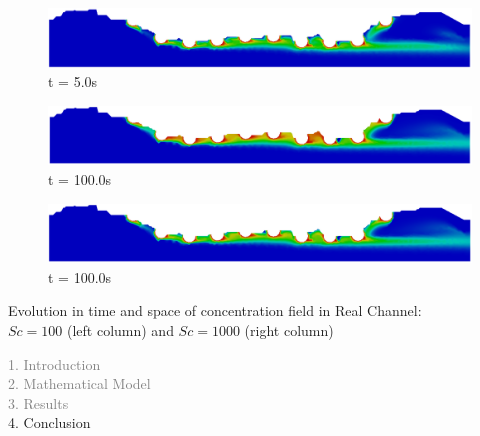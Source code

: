 \begin{frame}
\begin{figure}
     \begin{minipage}{.50\linewidth}
     \medskip
      \centering
      \includegraphics[scale=0.12]{images/conc1000_RealStrut5.png}\\
      \tiny t = 5.0s
     \end{minipage}
     \begin{minipage}{.50\linewidth}
      \centering
      \includegraphics[scale=0.12]{images/conc100_RealStrut8.png}\\
      \tiny t = 100.0s
     \end{minipage}%
     \begin{minipage}{.50\linewidth}
      \centering
      \includegraphics[scale=0.12]{images/conc1000_RealStrut8.png}\\
      \tiny t = 100.0s
     \end{minipage}
\end{figure}
\vspace{-0.2cm}
\centering \scriptsize Evolution in time and space of concentration field in Real Channel:\\
                 $Sc=100$ (left column) and $Sc=1000$ (right column)
\end{frame}
\fi




\begin{frame}
  \vspace{-1cm}
  \textcolor{gray}{1. Introduction}\\[0.1cm]
  \textcolor{gray}{2. Mathematical Model}\\[0.1cm]
  \textcolor{gray}{3. Results}\\[0.1cm]
  4. Conclusion
\end{frame}

